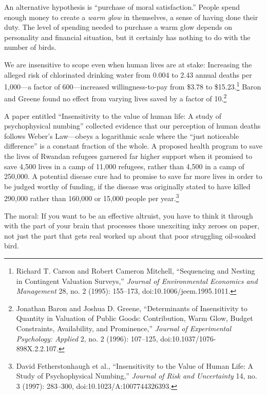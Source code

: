 {
 An alternative hypothesis is ``purchase of moral
satisfaction.'' People spend enough money to create a
\textit{warm glow} in themselves, a sense of having done their duty.
The level of spending needed to purchase a warm glow depends on
personality and financial situation, but it certainly has nothing to do
with the number of birds.}

{
 We are insensitive to scope even when human lives are at stake:
Increasing the alleged risk of chlorinated drinking water from 0.004 to
2.43 annual deaths per 1,000---a factor of 600---increased
willingness-to-pay from \$3.78 to \$15.23.\footnote{Richard T. Carson and Robert Cameron Mitchell,
``Sequencing and Nesting in Contingent Valuation
Surveys,'' \textit{Journal of Environmental Economics
and Management} 28, no. 2 (1995): 155--173,
doi:10.1006/jeem.1995.1011.} Baron and
Greene found no effect from varying lives saved by a factor of
10.\footnote{Jonathan Baron and Joshua D. Greene,
``Determinants of Insensitivity to Quantity in
Valuation of Public Goods: Contribution, Warm Glow, Budget Constraints,
Availability, and Prominence,'' \textit{Journal of
Experimental Psychology: Applied} 2, no. 2 (1996): 107--125,
doi:10.1037/1076-898X.2.2.107.}}

{
 A paper entitled ``Insensitivity to the value of
human life: A study of psychophysical numbing''
collected evidence that our perception of human deaths follows
Weber's Law---obeys a logarithmic scale where the
``just noticeable difference'' is a
constant fraction of the whole. A proposed health program to save the
lives of Rwandan refugees garnered far higher support when it promised
to save 4,500 lives in a camp of 11,000 refugees, rather than 4,500 in
a camp of 250,000. A potential disease cure had to promise to save far
more lives in order to be judged worthy of funding, if the disease was
originally stated to have killed 290,000 rather than 160,000 or 15,000
people per year.\footnote{David Fetherstonhaugh et al., ``Insensitivity
to the Value of Human Life: A Study of Psychophysical
Numbing,'' \textit{Journal of Risk and Uncertainty}
14, no. 3 (1997): 283--300, doi:10.1023/A:1007744326393.}}

{
 The moral: If you want to be an effective altruist, you have to
think it through with the part of your brain that processes those
unexciting inky zeroes on paper, not just the part that gets real
worked up about that poor struggling oil-soaked bird.}

\myendsectiontext


